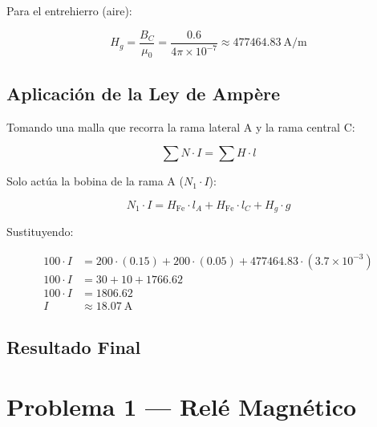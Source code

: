 \documentclass[12pt,a4paper]{article}
\begin{document}
Para el entrehierro (aire):

\begin{equation}
    H_g = \frac{B_C}{\mu_0}
    = \frac{0.6}{4\pi \times 10^{-7}}
    \approx \SI{477464.83}{\ampere\per\meter}
\end{equation}

\subsection{Aplicación de la Ley de Ampère}

Tomando una malla que recorra la rama lateral A y la rama central C:

\begin{equation}
    \sum N \cdot I = \sum H \cdot l
\end{equation}

Solo actúa la bobina de la rama A ($N_1 \cdot I$):

\begin{equation}
    N_1 \cdot I = H_{\text{Fe}} \cdot l_A + H_{\text{Fe}} \cdot l_C + H_g \cdot g
\end{equation}

Sustituyendo:

\begin{align}
    100 \cdot I &= 200 \cdot (0.15) + 200 \cdot (0.05) + 477464.83 \cdot (3.7 \times 10^{-3}) \nonumber \\
    100 \cdot I &= 30 + 10 + 1766.62 \nonumber \\
    100 \cdot I &= 1806.62 \nonumber \\
    I &\approx \SI{18.07}{\ampere}
\end{align}

\subsection{Resultado Final}

\noindent{}

\newpage

\section{Problema 1 --- Relé Magnético}
\end{document}
